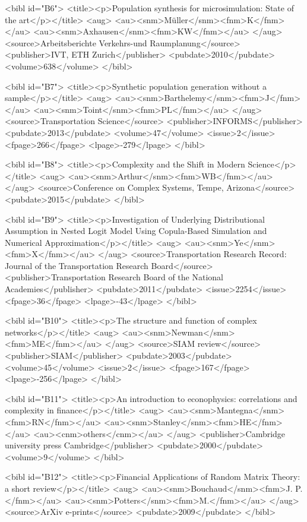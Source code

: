 \documentclass{article}
\begin{document}
{<bibl id="B6">
  <title><p>Population synthesis for microsimulation: State of the
  art</p></title>
  <aug>
    <au><snm>M{\"u}ller</snm><fnm>K</fnm></au>
    <au><snm>Axhausen</snm><fnm>KW</fnm></au>
  </aug>
  <source>Arbeitsberichte Verkehrs-und Raumplanung</source>
  <publisher>IVT, ETH Zurich</publisher>
  <pubdate>2010</pubdate>
  <volume>638</volume>
</bibl>

<bibl id="B7">
  <title><p>Synthetic population generation without a sample</p></title>
  <aug>
    <au><snm>Barthelemy</snm><fnm>J</fnm></au>
    <au><snm>Toint</snm><fnm>PL</fnm></au>
  </aug>
  <source>Transportation Science</source>
  <publisher>INFORMS</publisher>
  <pubdate>2013</pubdate>
  <volume>47</volume>
  <issue>2</issue>
  <fpage>266</fpage>
  <lpage>-279</lpage>
</bibl>

<bibl id="B8">
  <title><p>Complexity and the Shift in Modern Science</p></title>
  <aug>
    <au><snm>Arthur</snm><fnm>WB</fnm></au>
  </aug>
  <source>Conference on Complex Systems, Tempe, Arizona</source>
  <pubdate>2015</pubdate>
</bibl>

<bibl id="B9">
  <title><p>Investigation of Underlying Distributional Assumption in Nested
  Logit Model Using Copula-Based Simulation and Numerical
  Approximation</p></title>
  <aug>
    <au><snm>Ye</snm><fnm>X</fnm></au>
  </aug>
  <source>Transportation Research Record: Journal of the Transportation
  Research Board</source>
  <publisher>Transportation Research Board of the National
  Academies</publisher>
  <pubdate>2011</pubdate>
  <issue>2254</issue>
  <fpage>36</fpage>
  <lpage>-43</lpage>
</bibl>

<bibl id="B10">
  <title><p>The structure and function of complex networks</p></title>
  <aug>
    <au><snm>Newman</snm><fnm>ME</fnm></au>
  </aug>
  <source>SIAM review</source>
  <publisher>SIAM</publisher>
  <pubdate>2003</pubdate>
  <volume>45</volume>
  <issue>2</issue>
  <fpage>167</fpage>
  <lpage>-256</lpage>
</bibl>

<bibl id="B11">
  <title><p>An introduction to econophysics: correlations and complexity in
  finance</p></title>
  <aug>
    <au><snm>Mantegna</snm><fnm>RN</fnm></au>
    <au><snm>Stanley</snm><fnm>HE</fnm></au>
    <au><cnm>others</cnm></au>
  </aug>
  <publisher>Cambridge university press Cambridge</publisher>
  <pubdate>2000</pubdate>
  <volume>9</volume>
</bibl>

<bibl id="B12">
  <title><p>{Financial Applications of Random Matrix Theory: a short
  review}</p></title>
  <aug>
    <au><snm>{Bouchaud}</snm><fnm>J. P.</fnm></au>
    <au><snm>{Potters}</snm><fnm>M.</fnm></au>
  </aug>
  <source>ArXiv e-prints</source>
  <pubdate>2009</pubdate>
</bibl>

}
\end{document}
